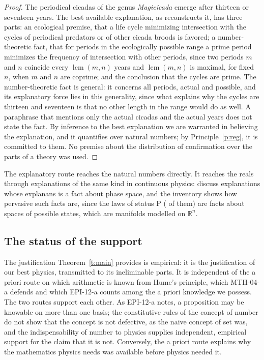 \documentclass{situationist-preprint}
\begin{document}
\begin{proof}
The periodical cicadas of the genus \emph{Magicicada} emerge after thirteen or seventeen years. The best available explanation, as \citet{Baker2005} reconstructs it, has three parts: an ecological premise, that a life cycle minimizing intersection with the cycles of periodical predators or of other cicada broods is favored; a number-theoretic fact, that for periods in the ecologically possible range a prime period minimizes the frequency of intersection with other periods, since two periods $m$ and $n$ coincide every $\operatorname{lcm}(m,n)$ years and $\operatorname{lcm}(m,n)$ is maximal, for fixed $n$, when $m$ and $n$ are coprime; and the conclusion that the cycles are prime. The number-theoretic fact is general: it concerns all periods, actual and possible, and its explanatory force lies in this generality, since what explains why the cycles are thirteen and seventeen is that no other length in the range would do as well. A paraphrase that mentions only the actual cicadas and the actual years does not state the fact. By inference to the best explanation we are warranted in believing the explanation, and it quantifies over natural numbers; by Principle~\ref{p:reg}, it is committed to them. No premise about the distribution of confirmation over the parts of a theory was used.
\end{proof}

The explanatory route reaches the natural numbers directly. It reaches the reals through explanations of the same kind in continuous physics: \citet{Lyon2008} discuss explanations whose explanans is a fact about phase space, and the inventory shows how pervasive such facts are, since the laws of status P (\nStatP{} of them) are facts about spaces of possible states, which are manifolds modelled on $\mathbb R^n$.

\subsection{The status of the support}

\begin{remark}\label{r:emp}
The justification Theorem~\ref{t:main} provides is empirical: it is the justification of our best physics, transmitted to its ineliminable parts. It is independent of the a priori route on which arithmetic is known from Hume's principle, which MTH-04-a defends and which EPI-12-a counts among the a priori knowledge we possess. The two routes support each other. As EPI-12-a notes, a proposition may be knowable on more than one basis; the constitutive rules of the concept of number do not show that the concept is not defective, as the naive concept of set was, and the indispensability of number to physics supplies independent, empirical support for the claim that it is not. Conversely, the a priori route explains why the mathematics physics needs was available before physics needed it.
\end{remark}
\end{document}
